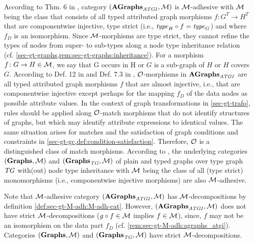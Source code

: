 \begin{remark}
\label{rem:sec-gt-M-adh:agraphs_atgi}
According to Thm. 6 in \cite{DBLP:journals/tcs/GolasLEO12}, category $(\mathbf{AGraphs}_\mathit{ATGI},{\cal M})$ is ${\cal M}$-adhesive with ${\cal M}$ being the class that consists of all typed attributed graph morphisms $f\colon G^T \to H^T$ that are componentwise injective, type strict (i.e., $\mathit{type}_H \circ f=\mathit{type}_G$) and where $f_D$ is an isomorphism.
Since ${\cal M}$-morphisms are type strict, they cannot refine the types of nodes from super- to sub-types along a node type inheritance relation (cf. \cref{sec-gt-graphs,rem:sec-gt-graphs:inheritance}).
For a morphism $f\colon G \to H \in {\cal M}$, we say that G occurs in H or $G$ is a sub-graph of $H$ or $H$ covers $G$.
According to Def. 12 in \cite{DBLP:journals/tcs/GolasLEO12,Hermann:2010:EAE:1866272.1866277} and Def. 7.3 in \cite{FAGT2}, ${\cal O}$-morphisms in $\mathbf{AGraphs}_\mathit{ATGI}$ are all typed attributed graph morphisms $f$ that are almost injective, i.e., that are componentwise injective except perhaps for the mapping $f_D$ of the data nodes as possible attribute values.
In the context of graph transformations in \cref{sec-gt-trafo}, rules should be applied along ${\cal O}$-match morphisms that do not identify structures of graphs, but which may identify attribute expressions to identical values.
The same situation arises for matches and the satisfaction of graph conditions and constraints in \cref{sec-gt-gc,def:condition-satisfaction}.
Therefore, ${\cal O}$ is a distinguished class of match morphisms.
According to \cite{FAGT2}, the underlying categories $(\mathbf{Graphs},{\cal M})$ and $(\mathbf{Graphs}_{\mathit{TG}},{\cal M})$ of plain and typed graphs over type graph $\mathit{TG}$ with(out) node type inheritance with ${\cal M}$ being the class of all (type strict) monomorphisms (i.e., componentwise injective morphisms) are also ${\cal M}$-adhesive.
\envEndMarker
\end{remark}

\begin{remark}
Note that ${\cal M}$-adhesive category $(\mathbf{AGraphs}_\mathit{ATGI},{\cal M})$ has ${\cal M}$-decompositions by definition \cref{def:sec-gt-M-adh:M-adh-cat}.
However, $(\mathbf{AGraphs}_\mathit{ATGI},{\cal M})$ does not have strict ${\cal M}$-decompositions ($g \circ f \in {\cal M}$ implies $f \in {\cal M}$), since, $f$ may not be an isomorphism on the data part $f_D$ (cf. \cref{rem:sec-gt-M-adh:agraphs_atgi}).
Categories $(\mathbf{Graphs},{\cal M})$ and $(\mathbf{Graphs}_\mathit{TG},{\cal M})$ have strict ${\cal M}$-decompositions.
\envEndMarker
\end{remark}

